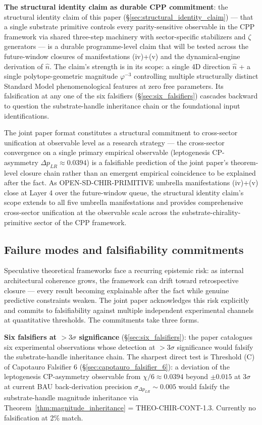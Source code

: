 \documentclass[11pt,letterpaper]{article}
\newcommand{\DeltapLR}{\Delta p_{LR}}
\begin{document}
\textbf{The structural identity claim as durable CPP commitment}: the structural identity claim of this paper (§\ref{sec:structural_identity_claim}) --- that a single substrate primitive controls every parity-sensitive observable in the CPP framework via shared three-step machinery with sector-specific stabilizers and $\zeta$ generators --- is a durable programme-level claim that will be tested across the future-window closures of manifestations (iv)+(v) and the dynamical-engine derivation of $\hat{n}$. The claim's strength is in its scope: a single 4D direction $\hat{n}$ + a single polytope-geometric magnitude $\varphi^{-3}$ controlling multiple structurally distinct Standard Model phenomenological features at zero free parameters. Its falsification at any one of the six falsifiers (§\ref{sec:six_falsifiers}) cascades backward to question the substrate-handle inheritance chain or the foundational input identifications.

The joint paper format constitutes a structural commitment to cross-sector unification at observable level as a research strategy --- the cross-sector convergence on a single primary empirical observable (leptogenesis CP-asymmetry $\DeltapLR \approx 0.0394$) is a falsifiable prediction of the joint paper's theorem-level closure chain rather than an emergent empirical coincidence to be explained after the fact. As OPEN-SD-CHIR-PRIMITIVE umbrella manifestations (iv)+(v) close at Layer 4 over the future-window queue, the structural identity claim's scope extends to all five umbrella manifestations and provides comprehensive cross-sector unification at the observable scale across the substrate-chirality-primitive sector of the CPP framework.

\subsection{Failure modes and falsifiability commitments}
\label{sec:failure_modes}

Speculative theoretical frameworks face a recurring epistemic risk: as internal architectural coherence grows, the framework can drift toward retrospective closure — every result becoming explainable after the fact while genuine predictive constraints weaken. The joint paper acknowledges this risk explicitly and commits to falsifiability against multiple independent experimental channels at quantitative thresholds. The commitments take three forms.

\textbf{Six falsifiers at $>3\sigma$ significance} (§\ref{sec:six_falsifiers}): the paper catalogues six experimental observations whose detection at $>3\sigma$ significance would falsify the substrate-handle inheritance chain. The sharpest direct test is Threshold (C) of Capotauro Falsifier 6 (§\ref{sec:capotauro_falsifier_6}): a deviation of the leptogenesis CP-asymmetry observable from $\chi/6 \approx 0.0394$ beyond $\pm 0.015$ at $3\sigma$ at current BAU back-derivation precision $\sigma_{\DeltapLR} \sim 0.005$ would falsify the substrate-handle magnitude inheritance via Theorem~\ref{thm:magnitude_inheritance} = THEO-CHIR-CONT-1.3. Currently no falsification at 2\% match.
\end{document}
